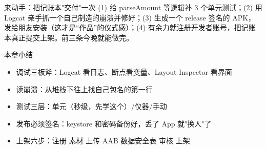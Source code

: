 \begin{tcbpractice}{来动手：把记账本"交付"一次}
(1) 给 parseAmount 等逻辑补 3 个单元测试；(2) 用 Logcat 亲手抓一个自己制造的崩溃并修好；(3) 生成一个 release 签名的 APK，发给朋友安装（这才是“作品”的仪式感）；(4) 有余力就注册开发者账号，把记账本真正提交上架。前三条今晚就能做完。

\end{tcbpractice}

\begin{tcbsummary}{本章小结}
\begin{itemize}
  \item 调试三板斧：Logcat 看日志、断点看变量、Layout Inspector 看界面
  \item 读崩溃：从堆栈下往上找自己包名的第一行
  \item 测试三层：单元（秒级，先学这个）/仪器/手动
  \item 发布必须签名：keystore 和密码备份好，丢了 App 就"换人"了
  \item 上架六步：注册 素材 上传 AAB 数据安全表 审核 上架
\end{itemize}

\end{tcbsummary}
